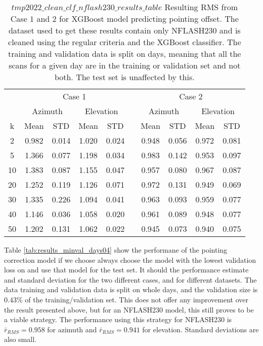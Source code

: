 \begin{table}[!htbp]
    \centering
    \label{tab:results_nflash_days}
    \caption{$tmp2022\_clean\_clf\_nflash230\_results\_table$
    Resulting RMS from Case $1$ and $2$ for XGBoost model predicting pointing offset.
    The dataset used to get these results contain only NFLASH230 and is cleaned using the regular criteria and the XGBoost classifier.
    The training and validation data is split on days, meaning that all the scans for a given day
    are in the training or validation set and not both. The test set is unaffected by this.}
    \begin{tabular}{ccccc c cccc}
        \toprule
        \multicolumn{1}{c}{} & \multicolumn{4}{c}{Case 1} & & \multicolumn{4}{c}{Case 2} \\
        \cmidrule(lr){2-5} \cmidrule(lr){7-10}
        \multicolumn{1}{c}{} & \multicolumn{2}{c}{Azimuth} & \multicolumn{2}{c}{Elevation} & & \multicolumn{2}{c}{Azimuth} & \multicolumn{2}{c}{Elevation} \\ 
        \cmidrule(lr){2-5} \cmidrule(lr){7-10}
        k & Mean & STD & Mean & STD & & Mean & STD & Mean & STD \\ 
        \midrule
         2 &     0.982 &     0.014 &     1.020 &     0.024 &  &  0.948 &     0.056 &     0.972 &     0.081 \\
         5 &     1.366 &     0.077 &     1.198 &     0.034 &  &  0.983 &     0.142 &     0.953 &     0.097 \\
        10 &     1.383 &     0.087 &     1.155 &     0.047 &  &  0.957 &     0.080 &     0.967 &     0.087 \\
        20 &     1.252 &     0.119 &     1.126 &     0.071 &  &  0.972 &     0.131 &     0.949 &     0.069 \\
        30 &     1.335 &     0.226 &     1.094 &     0.041 &  &  0.963 &     0.093 &     0.959 &     0.077 \\
        40 &     1.146 &     0.036 &     1.058 &     0.020 &  &  0.961 &     0.089 &     0.948 &     0.077 \\
        50 &     1.202 &     0.131 &     1.062 &     0.022 &  &  0.945 &     0.073 &     0.940 &     0.075 \\
        \bottomrule
    \end{tabular}
\end{table}



Table \ref{tab:results_minval_days04} show the performane of the pointing correction model if we choose always choose the model with the lowest validation
loss on and use that model for the test set. It should the performance estimate and standard deviation for the two different cases, and for different datasets.
The data training and validation data is split on whole days, and the validation size is $0.43\%$ of the training/validation set.
This does not offer any improvement over the result presented above, but for an NFLASH230 model, this still proves to be a viable strategy.
The performance using this strategy for NFLASH230 is $\bar{r}_{RMS}=0.958$ for azimuth and $\bar{r}_{RMS}=0.941$ for elevation. 
Standard deviations are also small.

